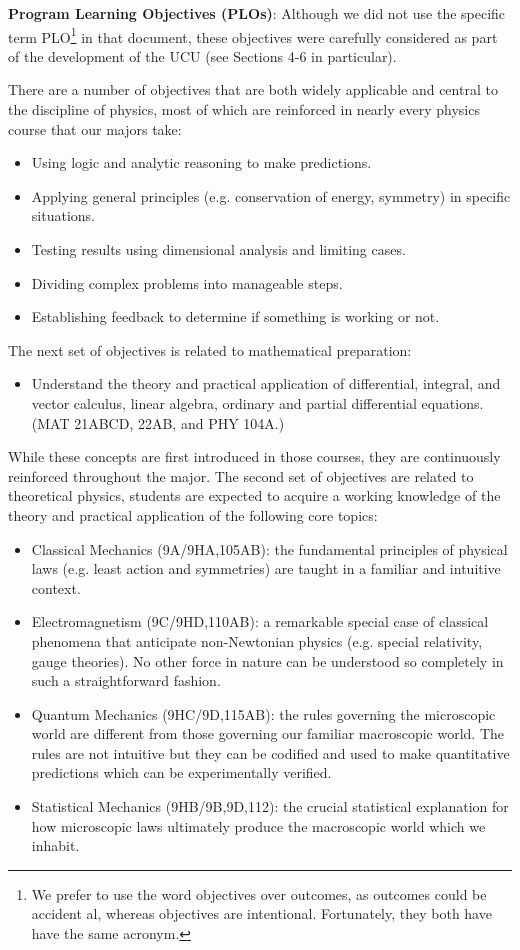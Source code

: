 \documentclass[12pt]{article}
\begin{document}
\noindent
{\bf Program Learning Objectives (PLOs)}: Although we did not use the
specific term PLO\footnote{We prefer to use the word objectives over
outcomes, as outcomes could be accident al, whereas objectives are
intentional.  Fortunately, they both have have the same acronym.} in
that document, these objectives were carefully considered as part of
the development of the UCU (see Sections 4-6 in particular).

There are a number of objectives that are both widely applicable and
central to the discipline of physics, most of which are reinforced in
nearly every physics course that our majors take:
\begin{itemize}
 \item Using logic and analytic reasoning to make predictions.
 \item Applying general principles (e.g. conservation of energy, symmetry) in specific 
situations. 
 \item Testing results using dimensional analysis and limiting cases. 
 \item Dividing complex problems into manageable steps.
 \item Establishing feedback to determine if something is working or not.
\end{itemize}  
The next set of objectives is related to mathematical preparation:
\begin{itemize}
\item Understand the theory and practical application of differential, integral, and vector 
calculus, linear algebra, ordinary and partial differential equations.  (MAT 21ABCD, 22AB, and 
PHY 104A.)
\end{itemize}
While these concepts are first introduced in those courses, they are continuously reinforced 
throughout the major.  The second set of objectives are related to theoretical physics, 
students are expected to acquire a working knowledge of the theory and practical application 
of the following core topics:
\begin{itemize}
 \item Classical Mechanics (9A/9HA,105AB): the fundamental principles of physical laws
  (e.g. least action and symmetries) are taught in a familiar and intuitive context. 
\item Electromagnetism (9C/9HD,110AB): a remarkable special case of classical
  phenomena that anticipate non-Newtonian physics (e.g. special
  relativity, gauge theories).  No other force in nature can be understood so
  completely in such a straightforward fashion.  
\item Quantum Mechanics (9HC/9D,115AB): the rules governing the microscopic world are
  different from those governing our familiar macroscopic world.  The
  rules are not intuitive but they can be codified and used to make
  quantitative predictions which can be experimentally verified.
\item Statistical Mechanics (9HB/9B,9D,112): the crucial statistical explanation for how
  microscopic laws ultimately produce the macroscopic world which we inhabit.
\end{itemize}
\end{document}
